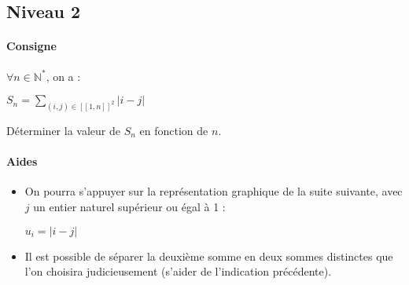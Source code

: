 \documentclass[a4paper]{report}
\begin{document}
			\subsection{Niveau 2}
				\begin{tcolorbox}[colback=white,colframe=black,title=Exercice - Somme et valeur absolue]
					\paragraph{Consigne}
						$\forall n \in \mathbb{N^*}$, on a :\\
							\begin{center}
								$S_n = \sum_{(i,j) \in [\![1,n]\!]^2}|i-j|$
							\end{center}
							Déterminer la valeur de $S_n$ en fonction de $n$.
						
					\tcblower
					
					\paragraph{Aides}
						\begin{itemize}
							\item On pourra s'appuyer sur la représentation graphique de la suite suivante, avec $j$ un entier naturel supérieur ou égal à 1 :
								\begin{center}
									$u_i = |i-j|$
								\end{center}
							\item Il est possible de séparer la deuxième somme en deux sommes distinctes que l'on choisira judicieusement (s'aider de l'indication précédente).
						\end{itemize}
				\end{tcolorbox}
				
\end{document}

